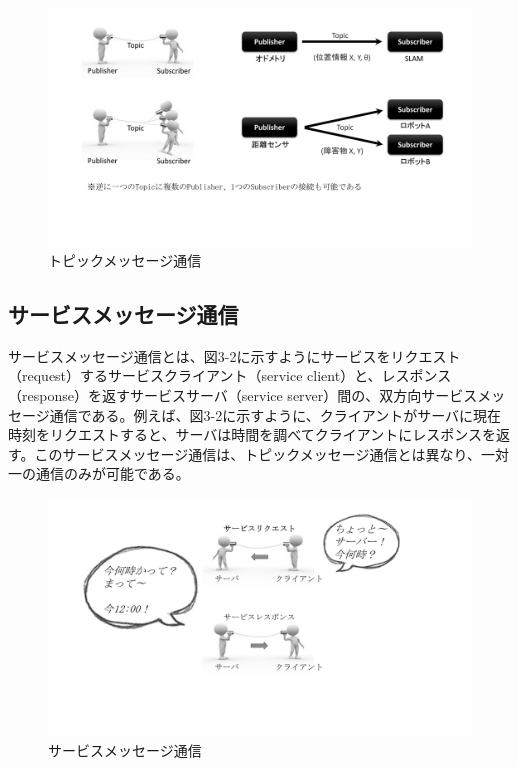\begin{figure}[h]
  \centering
  \includegraphics[width=\columnwidth]{pictures/chapter3/pic_03_01.png}
  \caption{トピックメッセージ通信}
\end{figure}

\subsection{サービスメッセージ通信}
サービスメッセージ通信とは、図3-2に示すようにサービスをリクエスト（request）するサービスクライアント（service client）と、レスポンス（response）を返すサービスサーバ（service server）間の、双方向サービスメッセージ通信である。例えば、図3-2に示すように、クライアントがサーバに現在時刻をリクエストすると、サーバは時間を調べてクライアントにレスポンスを返す。このサービスメッセージ通信は、トピックメッセージ通信とは異なり、一対一の通信のみが可能である。

\begin{figure}[h]
  \centering
  \includegraphics[width=\columnwidth]{pictures/chapter3/pic_03_02.png}
  \caption{サービスメッセージ通信}
\end{figure}

